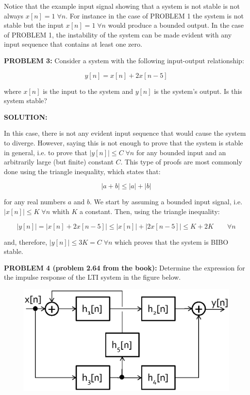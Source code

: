 \documentclass[11pt]{article}
\begin{document}
Notice that the example input signal showing that a system is not stable is not always $x[n]=1 \; \forall n$. For instance in the case of PROBLEM 1 the system is not stable but the input $x[n]=1 \; \forall n$ would produce a bounded output. In the case of PROBLEM 1, the instability of the system can be made evident with any input sequence that contains at least one zero.



\textbf{PROBLEM 3:} Consider a system with the following input-output relationship:

\[
y[n] = x[n]+2x[n-5]
\]

where $x[n]$ is the input to the system and $y[n]$ is the system's output. Is this system stable?

\vspace{1cm}

\textbf{SOLUTION:}

In this case, there is not any evident input sequence that would cause the system to diverge. However, saying this is not enough to prove that the system is stable in general, i.e. to prove that $|y[n]|\leq C \; \forall n$ for any bounded input and an arbitrarily large (but finite) constant $C$. This type of proofs are most commonly done using the triangle inequality, which states that:

\[
|a+b|\leq |a| + |b|
\]

for any real numbers $a$ and $b$. We start by assuming a bounded input signal, i.e. $|x[n]|\leq K \;\forall n$ whith $K$ a constant. Then, using the triangle inequality:

\[
|y[n]| = |x[n]+2x[n-5]|\leq |x[n]| + |2x[n-5]| \leq K + 2K \qquad \forall n
\]

and, therefore, $|y[n]|\leq 3K = C \; \forall n$ which proves that the system is BIBO stable.

\textbf{PROBLEM 4 (problem 2.64 from the book):}  Determine the expression for the impulse response of the LTI system in the figure below.


\begin{figure}[h!]
	\centering
		\includegraphics[width=.75\textwidth]{./system.eps}
\end{figure}
\end{document}
